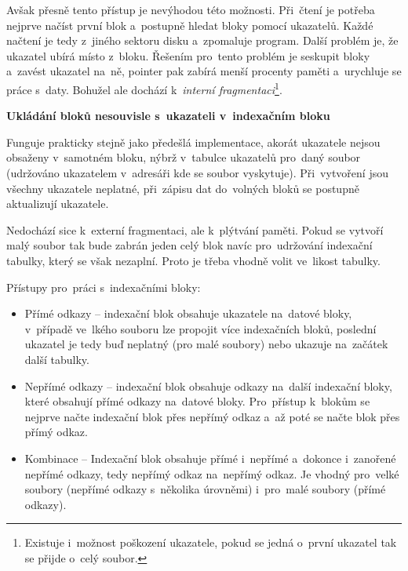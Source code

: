 \vspace{0,5cm}

Avšak přesně tento přístup je nevýhodou této možnosti. Při~čtení je potřeba nejprve načíst první blok a~postupně hledat bloky pomocí ukazatelů. Každé načtení je tedy z~jiného sektoru disku a~zpomaluje program. Další problém je, že ukazatel ubírá místo z~bloku. Řešením pro~tento problém je seskupit bloky a~zavést ukazatel na~ně, pointer pak zabírá menší procenty paměti a~urychluje se práce s~daty. Bohužel ale dochází k~\emph{interní fragmentaci}\footnote{Existuje i~možnost poškození ukazatele, pokud se jedná o~první ukazatel tak se přijde o~celý soubor.}.

\begin{large}
	\vspace{0,5cm}
	\textbf{Ukládání bloků nesouvisle s~ukazateli v~indexačním bloku}
\end{large}

Funguje prakticky stejně jako předešlá implementace, akorát ukazatele nejsou obsaženy v~samotném bloku, nýbrž v~tabulce ukazatelů pro~daný soubor (udržováno ukazatelem v~adresáři kde se soubor vyskytuje). Při~vytvoření jsou všechny ukazatele neplatné, při~zápisu dat do~volných bloků se postupně aktualizují ukazatele. 

\vspace{0,5cm}

Nedochází sice k~externí fragmentaci, ale k~plýtvání paměti. Pokud se vytvoří malý soubor tak bude zabrán jeden celý blok navíc pro~udržování indexační tabulky, který se však nezaplní. Proto je třeba vhodně volit ve~likost tabulky.

\vspace{0,5cm}

Přístupy pro~práci s~indexačními bloky:
\begin{itemize}
	\item Přímé odkazy -- indexační blok obsahuje ukazatele na~datové bloky, v~případě ve~lkého souboru lze propojit více indexačních bloků, poslední ukazatel je tedy buď neplatný (pro malé soubory) nebo ukazuje na~začátek další tabulky.
	\item Nepřímé odkazy -- indexační blok obsahuje odkazy na~další indexační bloky, které obsahují přímé odkazy na~datové bloky. Pro~přístup k~blokům se nejprve načte indexační blok přes nepřímý odkaz a~až poté se načte blok přes přímý odkaz. 
	\item Kombinace -- Indexační blok obsahuje přímé i~nepřímé a~dokonce i~zanořené nepřímé odkazy, tedy nepřímý odkaz na~nepřímý odkaz. Je vhodný pro~velké soubory (nepřímé odkazy s~několika úrovněmi) i~pro~malé soubory (přímé odkazy).
\end{itemize}

